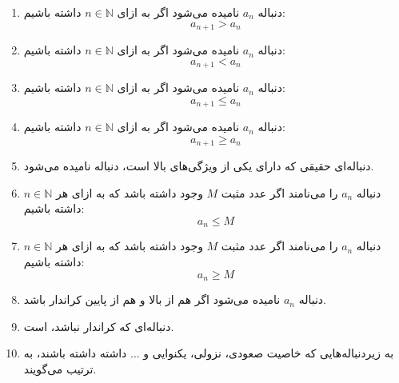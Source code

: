 \begin{DEFINITION}
\begin{enumerate}
\item
 دنباله
$a_n$
  نامیده می‌شود اگر به ازای
$n \in \mathbb{N}$
 داشته باشیم:
$$a_{n+1} > a_n$$

\item
 دنباله
$a_n$
  نامیده می‌شود اگر به ازای
$n \in \mathbb{N}$
 داشته باشیم:
$$a_{n+1} < a_n$$

\item
 دنباله
$a_n$
  نامیده می‌شود اگر به ازای
$n \in \mathbb{N}$
 داشته باشیم:
$$a_{n+1} \leq a_n$$

\item
 دنباله
$a_n$
  نامیده می‌شود اگر به ازای
$n \in \mathbb{N}$
 داشته باشیم:
$$a_{n+1} \geq a_n$$

\item
 دنباله‌ای حقیقی  که دارای یکی از ویژگی‌های بالا است، دنباله 
 نامیده می‌شود.

\item
 دنباله
$a_n$
 را  
  می‌نامند اگر عدد مثبت 
 $M$
 وجود داشته باشد که به ازای هر
$n \in \mathbb{N}$
 داشته باشیم:
$$a_{n} \leq M$$

\item
 دنباله
$a_n$
 را 
  می‌نامند اگر عدد مثبت 
 $M$
 وجود داشته باشد که به ازای هر
$n \in \mathbb{N}$
 داشته باشیم:
$$a_{n} \geq M$$

\item
 دنباله
$a_n$
 نامیده می‌شود اگر هم از بالا و هم از پایین کراندار باشد.

\item
دنباله‌ای که کراندار نباشد، 
 است.

\item 
به زیردنباله‌هایی که خاصیت صعودی، نزولی، یکنوایی و ... داشته داشته باشند، 
به ترتیب
 می‌گویند.

\end{enumerate}
\end{DEFINITION}

